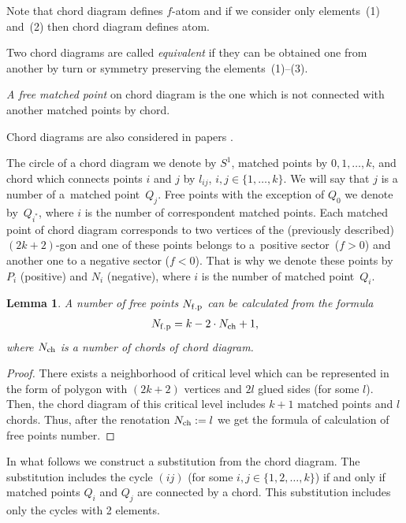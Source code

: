 \documentclass[pdftex]{sigma}
\numberwithin{equation}{section}
\newtheorem{Lemma}[Theorem]{Lemma}
 { \theoremstyle{definition}
\newtheorem{Definition}[Theorem]{Definition}
}
\begin{document}
Note that chord diagram def\/ines $f$-atom and if we consider only elements~(1) and~(2) then chord diagram def\/ines atom.

\begin{Definition}\label{definition3.5}
Two chord diagrams are called \emph{equivalent} if they can be obtained one from another by turn or symmetry preserving the elements~(1)--(3).
\end{Definition}

\begin{Definition}\label{definition3.6}
\emph{A free matched point} on chord diagram is the one which is not connected with another matched points by chord.
\end{Definition}

Chord diagrams are also considered in papers \cite{Kadubovskyi2015, Khruzin, Stoimenov2000}.

The circle of a chord diagram we denote by $S^{1}$, matched points by $0,1,\ldots,k$, and chord which connects points $i$ and $j$ by $l_{ij}$, $i,j\in\{1,\ldots,k\}$. We will say that $j$ is a number of a~matched point~$Q_{j}$. Free points with the exception of $Q_{0}$ we denote by~$Q_{i^{*}}$, where $i$ is the number of correspondent matched points. Each matched point of chord diagram corresponds to two vertices of the (previously described) $(2k+2)$-gon and one of these points belongs to a~positive sector~($f>0$) and another one to a negative sector ($f<0$). That is why we denote these points by~$P_{i}$ (positive) and $N_{i}$ (negative), where $i$ is the number of matched point~$Q_{i}$.

\begin{Lemma}\label{lemma3.1}
A number of free points $N_{\rm f.p}$ can be calculated from the formula
\begin{gather*}
N_{\rm f.p}=k-2\cdot N_{\rm ch}+1,
\end{gather*}
where $N_{\rm ch}$ is a number of chords of chord diagram.
\end{Lemma}

\begin{proof}
There exists a neighborhood of critical level which can be represented in the form of polygon with $(2k+2)$ vertices and $2l$ glued sides (for some $l$). Then, the chord diagram of this critical level includes $k+1$ matched points and $l$ chords. Thus, after the renotation $N_{\rm ch}:=l$ we get the formula of calculation of free points number.
\end{proof}

In what follows we construct a substitution from the chord diagram. The substitution includes the cycle $(ij)$ (for some $i,j\in\{1,2,\ldots,k\}$) if and only if matched points $Q_i$ and $Q_j$ are connected by a chord. This substitution includes only the cycles with 2 elements.
\end{document}
